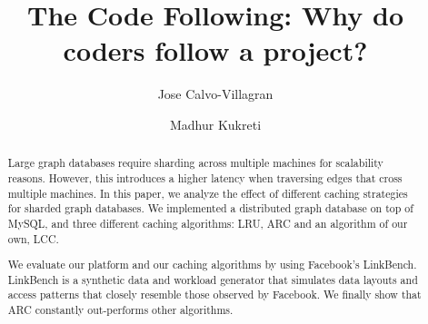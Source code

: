 \documentclass{acm_proc_article-sp}
\begin{document}
\title{The Code Following: Why do coders follow a project?}
\author{
\alignauthor
Jose Calvo-Villagran
\and
\alignauthor
Madhur Kukreti
}

\maketitle

\begin{abstract}
Large graph databases require sharding across multiple machines for scalability
reasons. However, this introduces a higher latency when traversing edges that
cross multiple machines. In this paper, we analyze the effect of different caching
strategies for sharded graph databases. We implemented a distributed graph
database on top of MySQL, and three different caching algorithms: LRU, ARC and
an algorithm of our own, LCC.

We evaluate our platform and our caching algorithms by using Facebook's LinkBench.
LinkBench is a synthetic data and workload generator that simulates data layouts and
access patterns that closely resemble those observed by Facebook. We finally show
that ARC constantly out-performs other algorithms.

\end{abstract}













\end{document}
